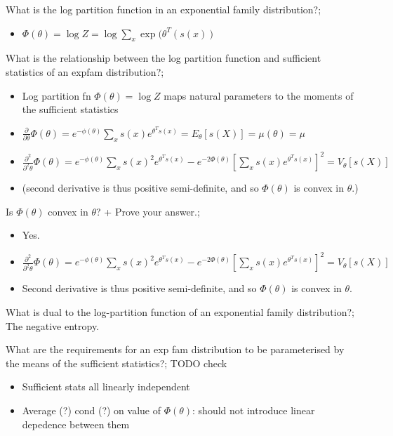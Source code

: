 \documentclass{article}
\begin{document}
What is the log partition function in an exponential family distribution?; \begin{itemize}
    \item $\Phi(\theta) = \log Z = \log \sum_x \exp (\theta^T(s(x))$
\end{itemize}

What is the relationship between the log partition function and sufficient statistics of an expfam distribution?; \begin{itemize}
    \item Log partition fn $\Phi(\theta) = \log Z$ maps natural parameters to the moments of the sufficient statistics
    \item $\frac{\partial}{\partial \theta}\Phi(\theta) = e^{-\phi(\theta)}\sum_x s(x)e^{\theta^Ts(x)}=E_{\theta}[s(X)] = \mu(\theta) = \mu$
    \item $\frac{\partial^2}{\partial^2 \theta}\Phi(\theta) = e^{-\phi(\theta)}\sum_x s(x)^2e^{\theta^Ts(x)} - e^{-2\Phi(\theta)}[\sum_x s(x)e^{\theta^Ts(x)}]^2 =V_{\theta}[s(X)]$
    \item (second derivative is thus positive semi-definite, and so $\Phi(\theta)$ is convex in $\theta$.)
\end{itemize}

Is $\Phi(\theta)$ convex in $\theta$? + Prove your answer.; \begin{itemize}
    \item Yes.
    \item $\frac{\partial^2}{\partial^2 \theta}\Phi(\theta) = e^{-\phi(\theta)}\sum_x s(x)^2e^{\theta^Ts(x)} - e^{-2\Phi(\theta)}[\sum_x s(x)e^{\theta^Ts(x)}]^2 =V_{\theta}[s(X)]$
    \item Second derivative is thus positive semi-definite, and so $\Phi(\theta)$ is convex in $\theta$.
\end{itemize}

What is dual to the log-partition function of an exponential family distribution?; The negative entropy.

What are the requirements for an exp fam distribution to be parameterised by the means of the sufficient statistics?; TODO check \begin{itemize}
    \item Sufficient stats all linearly independent
    \item Average (?) cond (?) on value of $\Phi(\theta)$: should not introduce linear depedence between them
\end{itemize}
\end{document}
